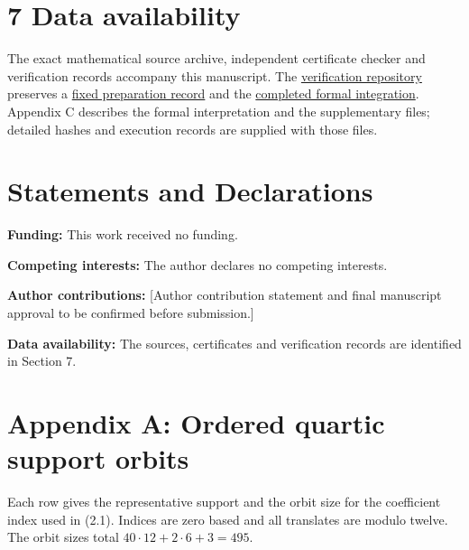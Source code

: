 \documentclass[11pt,a4paper]{article}
\begin{document}
\section*{7 Data availability}

The exact mathematical source archive, independent certificate checker and verification records accompany this manuscript. The \href{https://github.com/contatofilipevono-rgb/hrsbf-bent-verification}{verification repository} preserves a \href{https://github.com/contatofilipevono-rgb/hrsbf-bent-verification/tree/1e0e052/research_updates/2026_10_21_preprint}{fixed preparation record} and the \href{https://github.com/contatofilipevono-rgb/hrsbf-bent-verification/tree/9be0d98/research_updates/2026_10_20_final_integration}{completed formal integration}. Appendix C describes the formal interpretation and the supplementary files; detailed hashes and execution records are supplied with those files.

\section*{Statements and Declarations}

\textbf{Funding:} This work received no funding.

\textbf{Competing interests:} The author declares no competing interests.

\textbf{Author contributions:} [Author contribution statement and final manuscript approval to be confirmed before submission.]

\textbf{Data availability:} The sources, certificates and verification records are identified in Section 7.

\section*{Appendix A: Ordered quartic support orbits}

Each row gives the representative support and the orbit size for the coefficient index used in (2.1). Indices are zero based and all translates are modulo twelve. The orbit sizes total $40\cdot12+2\cdot6+3=495$.
\end{document}
